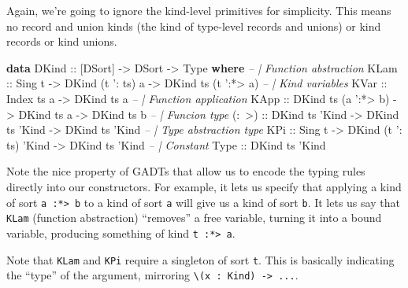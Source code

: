 \documentclass[]{article}
\newenvironment{Shaded}{}{}
\newcommand{\CommentTok}[1]{\textcolor[rgb]{0.38,0.63,0.69}{\textit{#1}}}
\newcommand{\DataTypeTok}[1]{\textcolor[rgb]{0.56,0.13,0.00}{#1}}
\newcommand{\FunctionTok}[1]{\textcolor[rgb]{0.02,0.16,0.49}{#1}}
\newcommand{\KeywordTok}[1]{\textcolor[rgb]{0.00,0.44,0.13}{\textbf{#1}}}
\newcommand{\NormalTok}[1]{#1}
\newcommand{\OtherTok}[1]{\textcolor[rgb]{0.00,0.44,0.13}{#1}}
\begin{document}
Again, we're going to ignore the kind-level primitives for simplicity. This
means no record and union kinds (the kind of type-level records and unions) or
kind records or kind unions.

\begin{Shaded}
\begin{Highlighting}[]
\KeywordTok{data} \DataTypeTok{DKind}\OtherTok{ ::}\NormalTok{ [}\DataTypeTok{DSort}\NormalTok{] }\OtherTok{->} \DataTypeTok{DSort} \OtherTok{->} \DataTypeTok{Type} \KeywordTok{where}
    \CommentTok{-- | Function abstraction}
    \DataTypeTok{KLam}\OtherTok{  ::} \DataTypeTok{Sing}\NormalTok{ t }\OtherTok{->} \DataTypeTok{DKind}\NormalTok{ (t '}\FunctionTok{:}\NormalTok{ ts) a }\OtherTok{->} \DataTypeTok{DKind}\NormalTok{ ts (t '}\FunctionTok{:*>}\NormalTok{ a)}
    \CommentTok{-- | Kind variables}
    \DataTypeTok{KVar}\OtherTok{  ::} \DataTypeTok{Index}\NormalTok{ ts a }\OtherTok{->} \DataTypeTok{DKind}\NormalTok{ ts a}
    \CommentTok{-- | Function application}
    \DataTypeTok{KApp}\OtherTok{  ::} \DataTypeTok{DKind}\NormalTok{ ts (a '}\FunctionTok{:*>}\NormalTok{ b) }\OtherTok{->} \DataTypeTok{DKind}\NormalTok{ ts a }\OtherTok{->} \DataTypeTok{DKind}\NormalTok{ ts b}
    \CommentTok{-- | Funcion type}
\OtherTok{    (:~>) ::} \DataTypeTok{DKind}\NormalTok{ ts }\DataTypeTok{'Kind} \OtherTok{->} \DataTypeTok{DKind}\NormalTok{ ts }\DataTypeTok{'Kind} \OtherTok{->} \DataTypeTok{DKind}\NormalTok{ ts }\DataTypeTok{'Kind}
    \CommentTok{-- | Type abstraction type}
    \DataTypeTok{KPi}\OtherTok{   ::} \DataTypeTok{Sing}\NormalTok{ t }\OtherTok{->} \DataTypeTok{DKind}\NormalTok{ (t '}\FunctionTok{:}\NormalTok{ ts) }\DataTypeTok{'Kind} \OtherTok{->} \DataTypeTok{DKind}\NormalTok{ ts }\DataTypeTok{'Kind}
    \CommentTok{-- | Constant}
    \DataTypeTok{Type}\OtherTok{  ::} \DataTypeTok{DKind}\NormalTok{ ts }\DataTypeTok{'Kind}
\end{Highlighting}
\end{Shaded}

Note the nice property of GADTs that allow us to encode the typing rules
directly into our constructors. For example, it lets us specify that applying a
kind of sort \texttt{a\ :*\textgreater{}\ b} to a kind of sort \texttt{a} will
give us a kind of sort \texttt{b}. It lets us say that \texttt{KLam} (function
abstraction) ``removes'' a free variable, turning it into a bound variable,
producing something of kind \texttt{t\ :*\textgreater{}\ a}.

Note that \texttt{KLam} and \texttt{KPi} require a singleton of sort \texttt{t}.
This is basically indicating the ``type'' of the argument, mirroring
\texttt{\textbackslash{}(x\ :\ Kind)\ -\textgreater{}\ ...}.
\end{document}
